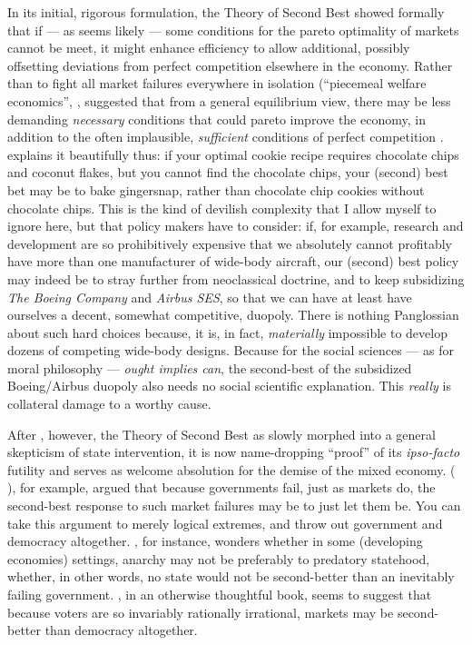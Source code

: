 In its initial, rigorous formulation, the Theory of Second Best showed formally that if --- as seems likely --- some conditions for the pareto optimality of markets cannot be meet, it might enhance efficiency to allow additional, possibly offsetting deviations from perfect competition elsewhere in the economy.
Rather than to fight all market failures everywhere in isolation (``piecemeal welfare economics'', \citeyearpar[11]{Lancaster1956}, \citeauthor{Lancaster1956} suggested that from a general equilibrium view, there may be less demanding \emph{necessary} conditions that could pareto improve the economy, in addition to the often implausible, \emph{sufficient} conditions of perfect competition \citeyearpar[17]{Lancaster1956}.
\cite{TheEconomist2007} explains it beautifully thus:
if your optimal cookie recipe requires chocolate chips and coconut flakes, but you cannot find the chocolate chips, your (second) best bet may be to bake gingersnap, rather than chocolate chip cookies without chocolate chips.
This is the kind of devilish complexity that I allow myself to ignore here, but that policy makers have to consider:
if, for example, research and development are so prohibitively expensive that we absolutely cannot profitably have more than one manufacturer of wide-body aircraft, our (second) best policy may indeed be to stray further from neoclassical doctrine, and to keep subsidizing \emph{The Boeing Company} and \emph{Airbus SES}, so that we can have at least have ourselves a decent, somewhat competitive, duopoly.
There is nothing Panglossian about such hard choices because, it is, in fact, \emph{materially} impossible to develop dozens of competing wide-body designs.
Because for the social sciences --- as for moral philosophy --- \emph{ought implies can}, the second-best of the subsidized Boeing/Airbus duopoly also needs no social scientific explanation.
This \emph{really} is collateral damage to a worthy cause.

After \citeyear{Lancaster1956}, however, the Theory of Second Best as slowly morphed into a general skepticism of state intervention, it is now name-dropping ``proof'' of its \emph{ipso-facto} futility and serves as welcome absolution for the demise of the mixed economy.
\citeauthor{Wolf1987}(\citeyear{Wolf1987,} \citeyear{Wolf1979}), for example, argued that because governments fail, just as markets do, the second-best response to such market failures may be to just let them be.
You can take this argument to merely logical extremes, and throw out government and democracy altogether.
\cite{Leeson2009}, for instance, wonders whether in some (developing economies) settings, anarchy may not be preferably to predatory statehood, whether, in other words, no state would not be second-better than an inevitably failing government.
\cite{Caplan2007}, in an otherwise thoughtful book, seems to suggest that because voters are so invariably rationally irrational, markets may be second-better than democracy altogether.

